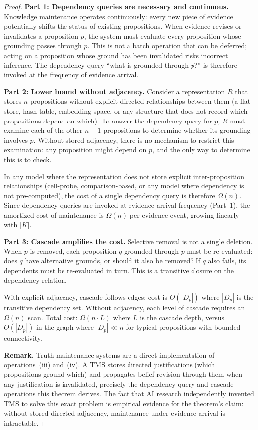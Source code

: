 \documentclass[11pt]{article}
\theoremstyle{definition}
\begin{document}
\begin{proof}
\textbf{Part 1: Dependency queries are necessary and continuous.}
Knowledge maintenance operates continuously: every new piece of evidence
potentially shifts the status of existing propositions. When evidence
revises or invalidates a proposition $p$, the system must evaluate every
proposition whose grounding passes through $p$. This is not a batch
operation that can be deferred; acting on a proposition whose ground
has been invalidated risks incorrect inference. The dependency query
``what is grounded through $p$?'' is therefore invoked at the frequency
of evidence arrival.

\textbf{Part 2: Lower bound without adjacency.}
Consider a representation $R$ that stores $n$ propositions without
explicit directed relationships between them (a flat store, hash table,
embedding space, or any structure that does not record which propositions
depend on which). To answer the dependency query for $p$, $R$ must
examine each of the other $n - 1$ propositions to determine whether its
grounding involves $p$. Without stored adjacency, there is no mechanism
to restrict this examination: any proposition might depend on $p$, and
the only way to determine this is to check.

In any model where the representation does not store explicit
inter-proposition relationships (cell-probe, comparison-based, or any
model where dependency is not pre-computed), the cost of a single
dependency query is therefore $\Omega(n)$. Since dependency queries are
invoked at evidence-arrival frequency (Part~1), the amortized cost of
maintenance is $\Omega(n)$ per evidence event, growing linearly with
$|K|$.

\textbf{Part 3: Cascade amplifies the cost.}
Selective removal is not a single deletion. When $p$ is removed, each
proposition $q$ grounded through $p$ must be re-evaluated: does $q$ have
alternative grounds, or should it also be removed? If $q$ also fails,
its dependents must be re-evaluated in turn. This is a transitive
closure on the dependency relation.

With explicit adjacency, cascade follows edges: cost is $O(|D_p|)$ where
$|D_p|$ is the transitive dependency set. Without adjacency, each level
of cascade requires an $\Omega(n)$ scan. Total cost: $\Omega(n \cdot L)$
where $L$ is the cascade depth, versus $O(|D_p|)$ in the graph where
$|D_p| \ll n$ for typical propositions with bounded connectivity.

\textbf{Remark.} Truth maintenance systems \cite{Doyle1979,DeKleer1986}
are a direct implementation of operations~(iii) and~(iv). A TMS stores
directed justifications (which propositions ground which) and propagates
belief revision through them when any justification is invalidated,
precisely the dependency query and cascade operations this theorem
derives. The fact that AI research independently invented
TMS to solve this exact problem is empirical evidence for the theorem's
claim: without stored directed adjacency, maintenance under evidence
arrival is intractable.


\end{proof}
\end{document}
